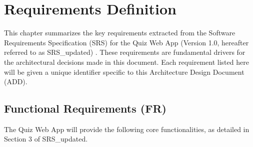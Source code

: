 
\chapter{Requirements Definition}
\label{chap:requirements_definition}

This chapter summarizes the key requirements extracted from the Software Requirements Specification (SRS) for the Quiz Web App (Version 1.0, hereafter referred to as SRS\_updated) \cite{srs_quiz_app}. These requirements are fundamental drivers for the architectural decisions made in this document. Each requirement listed here will be given a unique identifier specific to this Architecture Design Document (ADD).

\section{Functional Requirements (FR)}
\label{sec:functional_requirements}
The Quiz Web App will provide the following core functionalities, as detailed in Section 3 of SRS\_updated.

